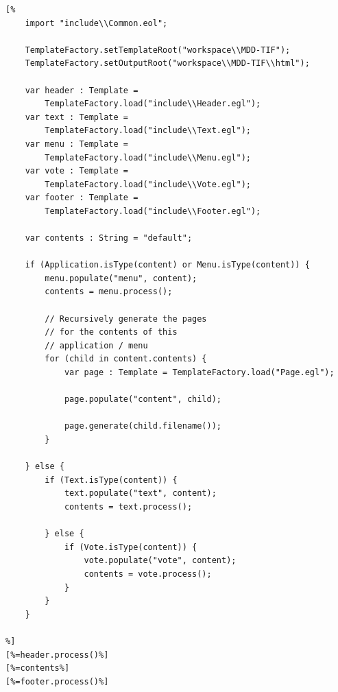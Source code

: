 \begin{lstlisting}[basicstyle=\ttfamily\footnotesize, nolol=true, flexiblecolumns=true, caption=EGL template that generates mockup HTML screens for a TVApp model, tabsize=2, label=lst:Mockup, language=EOL]
[%
	import "include\\Common.eol";

	TemplateFactory.setTemplateRoot("workspace\\MDD-TIF");
	TemplateFactory.setOutputRoot("workspace\\MDD-TIF\\html");
	
	var header : Template = 
		TemplateFactory.load("include\\Header.egl");
	var text : Template = 
		TemplateFactory.load("include\\Text.egl");	
	var menu : Template = 
		TemplateFactory.load("include\\Menu.egl");
	var vote : Template = 
		TemplateFactory.load("include\\Vote.egl");
	var footer : Template = 
		TemplateFactory.load("include\\Footer.egl");
	
	var contents : String = "default";
	
	if (Application.isType(content) or Menu.isType(content)) {
		menu.populate("menu", content);
		contents = menu.process();
		
		// Recursively generate the pages 
		// for the contents of this
		// application / menu
		for (child in content.contents) {
			var page : Template = TemplateFactory.load("Page.egl");
		
			page.populate("content", child);
			
			page.generate(child.filename());
		}

	} else {
		if (Text.isType(content)) {
			text.populate("text", content);
			contents = text.process();

		} else {
			if (Vote.isType(content)) {
				vote.populate("vote", content);
				contents = vote.process();
			}
		}
	}
	
%]
[%=header.process()%]
[%=contents%]
[%=footer.process()%]
\end{lstlisting}



